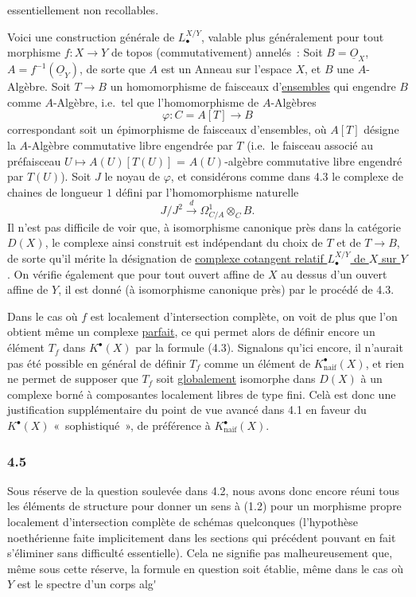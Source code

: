 essentiellement non recollables.

Voici une construction g\'en\'erale de $L^{X/Y}_\bullet$, valable plus g\'en\'eralement pour tout morphisme $f:X\to Y$ de topos (commutativement) annel\'es~: Soit $B=\underline O_X$, $A=f^{-1}(\underline O_Y)$, de sorte que $A$ est un Anneau sur l'espace $X$, et $B$ une $A$-Alg\`ebre. Soit $T\to B$ un homomorphisme de faisceaux d'\underline{ensembles} qui engendre $B$ comme $A$-Alg\`ebre, i.e.\ tel que l'homomorphisme de $A$-Alg\`ebres
\[
\varphi:C=A[T]\longrightarrow B
\]
correspondant soit un \'epimorphisme de faisceaux d'ensembles, o\`u $A[T]$ d\'esigne la $A$-Alg\`ebre commutative libre engendr\'ee par $T$ (i.e.\ le faisceau associ\'e au pr\'efaisceau $U\longmapsto A(U)[T(U)]$ = $A(U)$-alg\`ebre commutative libre engendr\'e par $T(U)$).
Soit $J$ le noyau de $\varphi$, et consid\'erons comme dans 4.3 le complexe de chaines de longueur $1$ d\'efini par l'homomorphisme naturelle
\[
J/J^2\xrightarrow{d}\Omega^1_{C/A}\otimes_C B.
\]
Il n'est pas difficile de voir que, \`a isomorphisme canonique pr\`es dans la cat\'egorie $D(X)$, le complexe ainsi construit est ind\'ependant du choix de $T$ et de $T\to B$, de sorte qu'il m\'erite la d\'esignation de \uline{complexe cotangent relatif $L^{X/Y}_\bullet$ de $X$ sur $Y$}. On v\'erifie \'egalement que pour tout ouvert affine de $X$ au dessus d'un ouvert affine de $Y$, il est donn\'e (\`a isomorphisme canonique pr\`es) par le proc\'ed\'e de 4.3.

Dans le cas o\`u $f$ est localement d'intersection compl\`ete, on voit de plus que l'on obtient m\^eme un complexe \underline{parfait}, ce qui permet alors de d\'efinir encore un \'el\'ement $T_f$ dans $K^\bullet(X)$ par la formule (4.3). Signalons qu'ici encore, il n'aurait pas \'et\'e possible en g\'en\'eral de d\'efinir $T_f$ comme un \'el\'ement de $K^\bullet_{\mathrm{naif}}(X)$, et rien ne permet de supposer que $T_f$ soit \underline{globalement} isomorphe dans $D(X)$ \`a un complexe born\'e \`a composantes localement libres de type fini. Cel\`a est donc une justification suppl\'ementaire du point de vue avanc\'e dans 4.1 en faveur du $K^\bullet(X)$ «~sophistiqu\'e~», de pr\'ef\'erence \`a $K^\bullet_{\mathrm{naif}}(X)$.

\subsubsection*{4.5}
Sous r\'eserve de la question soulev\'ee dans 4.2, nous avons donc encore r\'euni tous les \'el\'ements de structure pour donner un sens \`a (1.2) pour un morphisme propre localement d'intersection compl\`ete de sch\'emas quelconques (l'hypoth\`ese noeth\'erienne faite implicitement dans les sections qui pr\'ec\'edent pouvant en fait s'\'eliminer sans difficult\'e essentielle). Cela ne signifie pas malheureusement que, m\^eme sous cette r\'eserve, la formule en question soit \'etablie, m\^eme dans le cas o\`u $Y$ est le spectre d'un corps alg\'
